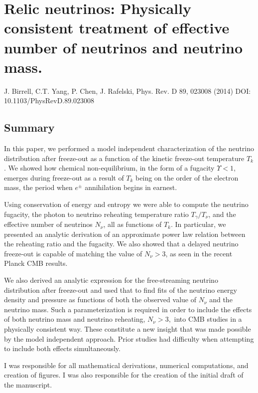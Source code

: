 \chapter{Relic neutrinos: Physically consistent treatment of effective number of neutrinos and neutrino mass.}\label{app:model_ind}

J. Birrell, C.T. Yang, P. Chen, J. Rafelski, Phys. Rev. D 89, 023008 (2014)
DOI: 10.1103/PhysRevD.89.023008

\section*{ Summary}

In this paper, we performed a model independent characterization of the neutrino distribution after freeze-out as a function of the kinetic freeze-out temperature $T_k$.  We showed how chemical non-equilibrium, in the form of a fugacity $\Upsilon<1$, emerges during freeze-out as a result of $T_k$ being on the order of the electron mass, the period when $e^\pm$ annihilation begins in earnest.

Using conservation of energy and entropy we were able to compute the neutrino fugacity, the photon to neutrino reheating temperature ratio $T_\gamma/T_\nu$, and the effective number of neutrinos $N_\nu$, all as functions of $T_k$.  In particular, we presented an analytic derivation of an approximate power law relation between the  reheating ratio and the fugacity.  We also showed that a delayed neutrino freeze-out is capable of matching the value of $N_\nu>3$, as seen in the recent Planck CMB results.

We also derived an analytic expression for the free-streaming neutrino distribution after freeze-out and used that to find fits of the neutrino energy density and pressure as functions of both the observed value of $N_\nu$ and the neutrino mass.  Such a parameterization is required in order to include the effects of both neutrino mass and neutrino reheating, $N_\nu>3,$ into CMB studies in a physically consistent way.  These constitute a new insight that was made possible by the model independent approach.  Prior studies had difficulty when attempting to include both effects simultaneously.

I was responsible for all mathematical derivations, numerical computations, and creation of figures.  I was also responsible for the creation of the initial draft of the manuscript.
